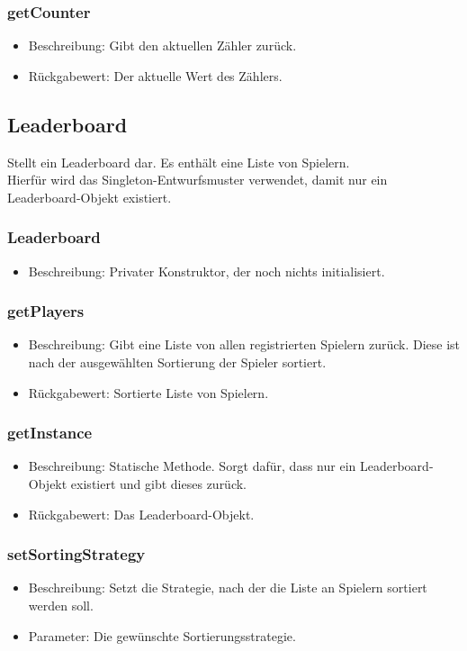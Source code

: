 \documentclass[a4paper]{scrreprt}
\begin{document}
	\subsubsection{getCounter}
	\begin{itemize}
		\item Beschreibung: Gibt den aktuellen Zähler zurück.
		\item Rückgabewert: Der aktuelle Wert des Zählers.
	\end{itemize}


	\subsection{Leaderboard}
	Stellt ein Leaderboard dar. Es enthält eine Liste von Spielern. \\
	Hierfür wird das Singleton-Entwurfsmuster verwendet, damit nur ein Leaderboard-Objekt existiert.

	\subsubsection{Leaderboard}
	\begin{itemize}
		\item Beschreibung: Privater Konstruktor, der noch nichts initialisiert.
	\end{itemize}
	\subsubsection{getPlayers}
	\begin{itemize}
		\item Beschreibung: Gibt eine Liste von allen registrierten Spielern zurück. Diese ist nach der ausgewählten Sortierung der Spieler sortiert.
		\item Rückgabewert: Sortierte Liste von Spielern.
	\end{itemize}
	\subsubsection{getInstance}
	\begin{itemize}
		\item Beschreibung: Statische Methode. Sorgt dafür, dass nur ein Leaderboard-Objekt existiert und gibt dieses zurück.
		\item Rückgabewert: Das Leaderboard-Objekt.
	\end{itemize}
	\subsubsection{setSortingStrategy}
	\begin{itemize}
		\item Beschreibung: Setzt die Strategie, nach der die Liste an Spielern sortiert werden soll.
		\item Parameter: Die gewünschte Sortierungsstrategie.
	\end{itemize}
\end{document}
